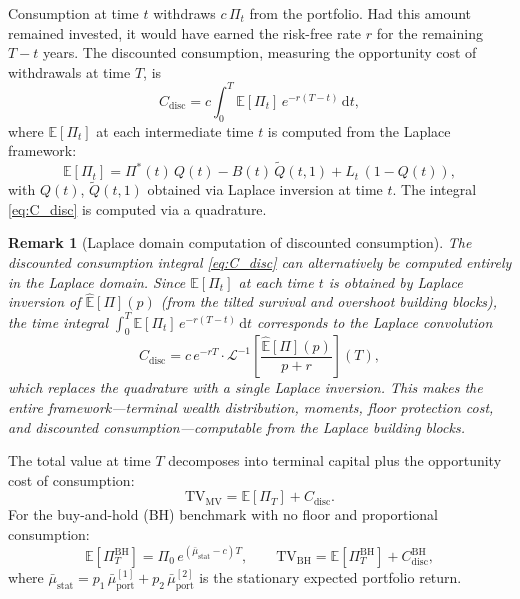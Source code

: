 \documentclass[11pt,a4paper]{article}
\numberwithin{equation}{section}
\newtheorem{remark}[theorem]{Remark}
\newcommand{\E}{\mathbb{E}}
\newcommand{\Lp}{\mathcal{L}}
\newcommand{\dd}{\mathrm{d}}
\begin{document}
Consumption at time $t$ withdraws $c\,\Pi_t$ from the portfolio.  Had this amount 
remained invested, it would have earned the risk-free rate $r$ for the remaining 
$T - t$ years.  The discounted consumption, measuring the opportunity cost of 
withdrawals at time $T$, is
\begin{equation}\label{eq:C_disc}
C_{\mathrm{disc}} = c \int_0^T \E[\Pi_t]\, e^{-r(T-t)} \,\dd t,
\end{equation}
where $\E[\Pi_t]$ at each intermediate time $t$ is computed from the Laplace framework:
\begin{equation}\label{eq:E_Pi_t}
\E[\Pi_t] = \Pi^*(t)\, Q(t) - B(t)\, \widetilde{Q}(t, 1) + L_t\,(1 - Q(t)),
\end{equation}
with $Q(t)$, $\widetilde{Q}(t, 1)$ obtained via Laplace inversion at time $t$.  
The integral \eqref{eq:C_disc} is computed via a quadrature.


\begin{remark}[Laplace domain computation of discounted consumption]\label{rem:laplace_consumption}
The discounted consumption integral \eqref{eq:C_disc} can alternatively be computed entirely in the Laplace domain.  Since $\E[\Pi_t]$ at each time $t$ is obtained by Laplace inversion of $\hat{\E}[\Pi](p)$ (from the tilted survival and overshoot building blocks), the time integral $\int_0^T \E[\Pi_t]\, e^{-r(T-t)}\,\dd t$ corresponds to the Laplace convolution
\begin{equation}\label{eq:C_disc_laplace}
C_{\mathrm{disc}} = c\,e^{-rT} \cdot \Lp^{-1}\!\left[\frac{\hat{\E}[\Pi](p)}{p + r}\right]\!(T),
\end{equation}
which replaces the quadrature with a single Laplace inversion.  This makes the entire framework---terminal wealth distribution, moments, floor protection cost, and discounted consumption---computable from the Laplace building blocks. 
\end{remark}



The total value at time $T$ decomposes into terminal capital plus the opportunity cost of consumption:
\begin{equation}\label{eq:TV}
\mathrm{TV}_{\mathrm{MV}} = \E[\Pi_T] + C_{\mathrm{disc}}.
\end{equation}
For the buy-and-hold (BH) benchmark with no floor and proportional consumption:
\begin{equation}\label{eq:TV_BH}
\E[\Pi_T^{\mathrm{BH}}] = \Pi_0\, e^{(\bar{\mu}_{\mathrm{stat}} - c)T}, \qquad
\mathrm{TV}_{\mathrm{BH}} = \E[\Pi_T^{\mathrm{BH}}] + C_{\mathrm{disc}}^{\mathrm{BH}},
\end{equation}
where $\bar{\mu}_{\mathrm{stat}} = p_1\,\bar{\mu}^{[1]}_{\mathrm{port}} + p_2\,\bar{\mu}^{[2]}_{\mathrm{port}}$ is the stationary expected portfolio return.
\end{document}
